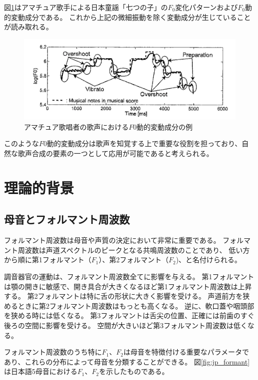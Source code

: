 \documentclass[10.5ptj,a4j,dvipdfmx,uplatex, oneside, openany]{jsbook}%
\begin{document}
図\ref{f0_moving}はアマチュア歌手による日本童謡「七つの子」の$F_0$変化パターンおよび$F_0$動的変動成分である。
これから上記の微細振動を除く変動成分が生じていることが読み取れる。

\begin{figure}[htbp]
    \begin{center}
      \includegraphics[clip,width=12.0cm]{f0_moving.png}
      \caption{アマチュア歌唱者の歌声における$F0$動的変動成分の例\cite{singbyspeaking}}
      \label{f0_moving}
    \end{center}
\end{figure}

このような$F0$動的変動成分は歌声を知覚する上で重要な役割を担っており、自然な歌声合成の要素の一つとして応用が可能であると考えられる。




\chapter{理論的背景}
\section{母音とフォルマント周波数}
フォルマント周波数は母音や声質の決定において非常に重要である。
フォルマント周波数は声道スペクトルのピークとなる共鳴周波数のことであり、
低い方から順に第1フォルマント（$F_1$）、第2フォルマント（$F_2$)、と名付けられる。

調音器官の運動は、フォルマント周波数全てに影響を与える。
第1フォルマントは顎の開きに敏感で、開き具合が大きくなるほど第1フォルマント周波数は上昇する。
第2フォルマントは特に舌の形状に大きく影響を受ける。
声道前方を狭めるときに第2フォルマント周波数はもっとも高くなる。
逆に、軟口蓋や咽頭部を狭める時には低くなる。
第3フォルマントは舌尖の位置、正確には前歯のすぐ後ろの空間に影響を受ける。
空間が大きいほど第3フォルマント周波数は低くなる。

フォルマント周波数のうち特に$F_1$、$F_2$は母音を特徴付ける重要なパラメータであり、これらの分布によって母音を分類することができる\cite{japanese_vowels}。
図\ref{fig:jp_formant}は日本語5母音における$F_1$、$F_2$を示したものである。
\end{document}
